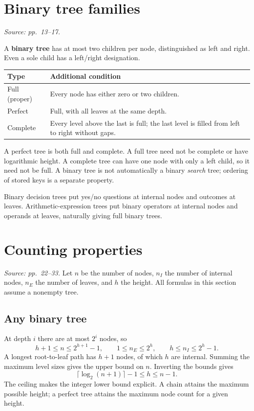 \documentclass[11pt]{article}
\begin{document}
\section{Binary tree families}
\textit{Source: pp.\ 13--17.}

A \textbf{binary tree} has at most two children per node, distinguished as left and right. Even a sole child has a left/right designation.
\begin{center}
\begin{tabularx}{\textwidth}{lX}
\toprule
Type & Additional condition\\
\midrule
Full (proper) & Every node has either zero or two children.\\
Perfect & Full, with all leaves at the same depth.\\
Complete & Every level above the last is full; the last level is filled from left to right without gaps.\\
\bottomrule
\end{tabularx}
\end{center}
A perfect tree is both full and complete. A full tree need not be complete or have logarithmic height. A complete tree can have one node with only a left child, so it need not be full. A binary tree is not automatically a binary \emph{search} tree; ordering of stored keys is a separate property.

Binary decision trees put yes/no questions at internal nodes and outcomes at leaves. Arithmetic-expression trees put binary operators at internal nodes and operands at leaves, naturally giving full binary trees.

\section{Counting properties}
\textit{Source: pp.\ 22--33.}
Let $n$ be the number of nodes, $n_I$ the number of internal nodes, $n_E$ the number of leaves, and $h$ the height. All formulas in this section assume a nonempty tree.

\subsection{Any binary tree}
At depth $i$ there are at most $2^i$ nodes, so
\[
h+1\le n\le 2^{h+1}-1,\qquad
1\le n_E\le2^h,\qquad
h\le n_I\le2^h-1.
\]
A longest root-to-leaf path has $h+1$ nodes, of which $h$ are internal. Summing the maximum level sizes gives the upper bound on $n$. Inverting the bounds gives
\[
\lceil\log_2(n+1)\rceil-1\le h\le n-1.
\]
The ceiling makes the integer lower bound explicit. A chain attains the maximum possible height; a perfect tree attains the maximum node count for a given height.
\end{document}
